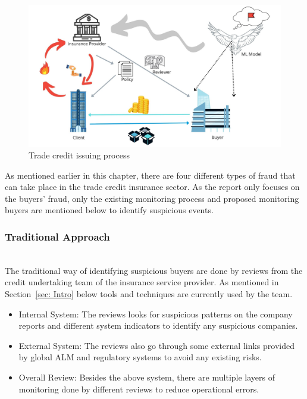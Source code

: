 \begin{figure}[htp]
    \centering
    \includegraphics[width=\linewidth]{figures/monitor_buyers.jpg}
    \caption{Trade credit issuing process}
    \label{fig:trade_credit}
\end{figure}


As mentioned earlier in this chapter, there are four different types of fraud that can take place in the trade credit insurance sector. As the report only focuses on the buyers' fraud, only the existing monitoring process and proposed monitoring buyers are mentioned below to identify suspicious events.

\subsubsection{Traditional Approach}\hspace*{\fill} \\
The traditional way of identifying suspicious buyers are done by reviews from the credit undertaking team of the insurance service provider. As mentioned in Section~\ref{sec: Intro} below tools and techniques are currently used by the team.
\begin{itemize}
    \item{Internal System:} The reviews looks for suspicious patterns on the company reports and different system indicators to identify any suspicious companies.
    \item{External System:} The reviews also go through some external links provided by global ALM and regulatory systems to avoid any existing risks.
    \item{Overall Review:} Besides the above system, there are multiple layers of monitoring done by different reviews to reduce operational errors.
\end{itemize}

